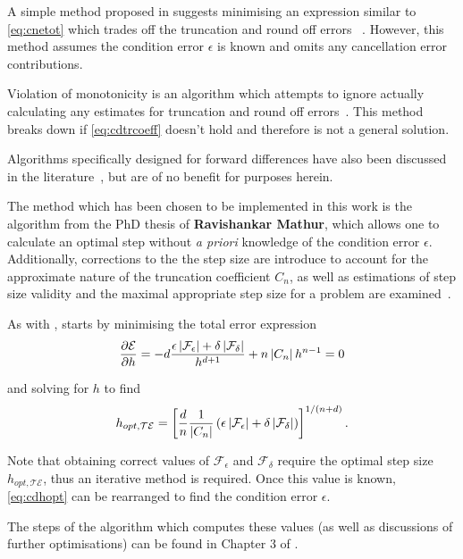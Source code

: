 A simple method proposed in \citeauthor{Gill1982} suggests minimising an expression similar to \cref{eq:cnetot} which trades off the truncation and round off errors ~\cite{Gill1982,Mathews2004}.
However, this method assumes the condition error $\epsilon$ is known and omits any cancellation error contributions.

Violation of monotonicity is an algorithm which attempts to ignore actually calculating any estimates for truncation and round off errors~\cite{Stepleman1979}. This method breaks down if \cref{eq:cdtrcoeff} doesn't hold and therefore is not a general solution.

Algorithms specifically designed for forward differences have also been discussed in the literature~\cite{Barton1992}, but are of no benefit for purposes herein.

The method which has been chosen to be implemented in this work is the algorithm from the PhD thesis of \textbf{Ravishankar Mathur}, which allows one to calculate an optimal step without \emph{a priori} knowledge of the condition error $\epsilon$.
Additionally, corrections to the the step size are introduce to account for the approximate nature of the truncation coefficient $C_n$, as well as estimations of step size validity and the maximal appropriate step size for a problem are examined~\cite{Mathur2012}.

As with \citeauthor{Gill1982}, \citeauthor{Mathur2012} starts by minimising the total error expression
\begin{equation}
\frac{\partial\mathcal{E}}{\partial h} = -d\frac{\epsilon\left\lvert \mathcal{F}_\epsilon\right\rvert+\delta\left\lvert \mathcal{F}_\delta\right\rvert}{h^{d+1}} + n\left\lvert C_n\right\rvert h^{n-1} = 0
\end{equation}

and solving for $h$ to find
\begin{equation}
h_{opt,\mathcal{TE}} = \left[\frac{d}{n}\frac{1}{\left\lvert C_n\right\rvert}\left(\epsilon\left\lvert \mathcal{F}_\epsilon\right\rvert+
\delta\left\lvert \mathcal{F}_\delta\right\rvert\right)\right]^{1/(n+d)}.\label{eq:cdhopt}
\end{equation}

Note that obtaining correct values of $\mathcal{F}_\epsilon$ and $\mathcal{F}_\delta$ require the optimal step size $h_{opt,\mathcal{TE}}$, thus an iterative method is required.
Once this value is known, \cref{eq:cdhopt} can be rearranged to find the condition error $\epsilon$.

The steps of the algorithm which computes these values (as well as discussions of further optimisations) can be found in Chapter 3 of .

